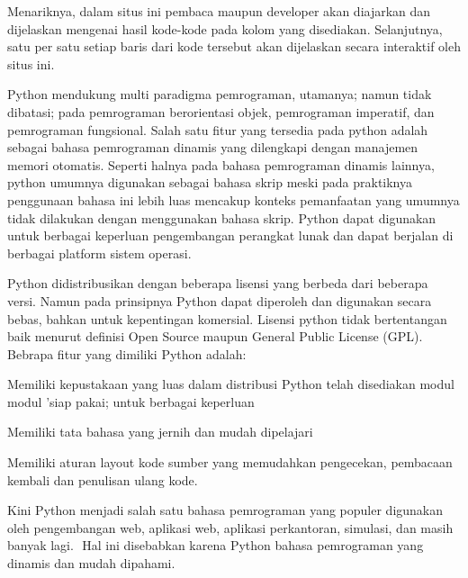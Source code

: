 \noindent 
{\fontsize{14pt}{14pt}\selectfont Menariknya, dalam situs ini pembaca maupun developer akan diajarkan dan dijelaskan mengenai hasil kode-kode pada kolom yang disediakan. Selanjutnya, satu per satu setiap baris dari kode tersebut akan dijelaskan secara interaktif oleh situs ini. \\} \par
\noindent 
{\fontsize{14pt}{14pt}\selectfont Python mendukung multi paradigma pemrograman, utamanya; namun tidak dibatasi; pada pemrograman berorientasi objek, pemrograman imperatif, dan pemrograman fungsional. Salah satu fitur yang tersedia pada python adalah sebagai bahasa pemrograman dinamis yang dilengkapi dengan manajemen memori otomatis. Seperti halnya pada bahasa pemrograman dinamis lainnya, python umumnya digunakan sebagai bahasa skrip meski pada praktiknya penggunaan bahasa ini lebih luas mencakup konteks pemanfaatan yang umumnya tidak dilakukan dengan menggunakan bahasa skrip. Python dapat digunakan untuk berbagai keperluan pengembangan perangkat lunak dan dapat berjalan di berbagai platform sistem operasi. \\} \par
\noindent 
{\fontsize{14pt}{14pt}\selectfont Python didistribusikan dengan beberapa lisensi yang berbeda dari beberapa versi. Namun pada prinsipnya Python dapat diperoleh dan digunakan secara bebas, bahkan untuk kepentingan komersial. Lisensi python tidak bertentangan baik menurut definisi Open Source maupun General Public License (GPL).\vspace{\baselineskip}
Bebrapa fitur yang dimiliki Python adalah: \\} \par
\noindent 
{\fontsize{14pt}{14pt}\selectfont Memiliki kepustakaan yang luas dalam distribusi Python telah disediakan modul modul 'siap pakai; untuk berbagai keperluan \\} \par
\noindent 
{\fontsize{14pt}{14pt}\selectfont Memiliki tata bahasa yang jernih dan mudah dipelajari \\} \par
\noindent 
{\fontsize{14pt}{14pt}\selectfont Memiliki aturan layout kode sumber yang memudahkan pengecekan, pembacaan kembali dan penulisan ulang kode.  \\} \par
\noindent 
{\fontsize{14pt}{14pt}\selectfont Kini Python menjadi salah satu bahasa pemrograman yang populer digunakan oleh pengembangan $  $web, aplikasi $  $web, aplikasi perkantoran, simulasi, dan masih banyak lagi. $  $ Hal ini disebabkan karena Python bahasa pemrograman yang dinamis dan mudah dipahami. \\} \par
